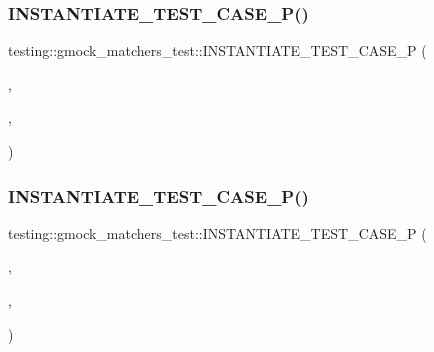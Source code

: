 \subsubsection{\texorpdfstring{INSTANTIATE\_TEST\_CASE\_P()}{INSTANTIATE\_TEST\_CASE\_P()}\hspace{0.1cm}{\footnotesize\ttfamily [1/3]}}
{\footnotesize\ttfamily testing\+::gmock\+\_\+matchers\+\_\+test\+::\+I\+N\+S\+T\+A\+N\+T\+I\+A\+T\+E\+\_\+\+T\+E\+S\+T\+\_\+\+C\+A\+S\+E\+\_\+P (\begin{DoxyParamCaption}\item[{All\+Graphs}]{,  }\item[{\mbox{\hyperlink{classtesting_1_1gmock__matchers__test_1_1BipartiteTest}{Bipartite\+Test}}}]{,  }\item[{\+::\mbox{\hyperlink{namespacetesting_a265ed70a86cf2d6641582c45ad9529e2}{testing\+::\+Range}}(0, 5)}]{ }\end{DoxyParamCaption})}

\mbox{\label{namespacetesting_1_1gmock__matchers__test_a64ef722e930c3088ddea704ac20194b5}} 
\subsubsection{\texorpdfstring{INSTANTIATE\_TEST\_CASE\_P()}{INSTANTIATE\_TEST\_CASE\_P()}\hspace{0.1cm}{\footnotesize\ttfamily [2/3]}}
{\footnotesize\ttfamily testing\+::gmock\+\_\+matchers\+\_\+test\+::\+I\+N\+S\+T\+A\+N\+T\+I\+A\+T\+E\+\_\+\+T\+E\+S\+T\+\_\+\+C\+A\+S\+E\+\_\+P (\begin{DoxyParamCaption}\item[{All\+Graphs}]{,  }\item[{\mbox{\hyperlink{classtesting_1_1gmock__matchers__test_1_1BipartiteNonSquareTest}{Bipartite\+Non\+Square\+Test}}}]{,  }\item[{\mbox{\hyperlink{namespacetesting_a8209ef59db08b8ad4beed30d8d6e6a88}{testing\+::\+Values}}(std\+::make\+\_\+pair(1, 2), std\+::make\+\_\+pair(2, 1), std\+::make\+\_\+pair(3, 2), std\+::make\+\_\+pair(2, 3), std\+::make\+\_\+pair(4, 1), std\+::make\+\_\+pair(1, 4), std\+::make\+\_\+pair(4, 3), std\+::make\+\_\+pair(3, 4))}]{ }\end{DoxyParamCaption})}

